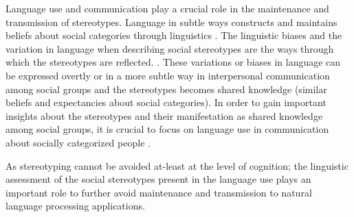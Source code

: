  Language use and communication play a crucial role in the maintenance and transmission of stereotypes. Language in subtle ways constructs and maintains beliefs about social categories through linguistics \cite{beukeboom2019stereotypes}.  The linguistic biases and the variation in language when describing social stereotypes are the ways through which the stereotypes are reflected. \cite{burgers2020language}. These variations or biases in language can be expressed overtly or in a more subtle way in interpersonal communication among social groups and the stereotypes becomes shared knowledge (similar beliefs and expectancies about social categories). In order to gain important insights about the stereotypes and their manifestation as shared knowledge among social groups, it is crucial to focus on language use in communication about socially categorized people \cite{beukeboom2019stereotypes}.
 
 
 
 
 
 
 \pagebreak

As stereotyping cannot be avoided at-least at the level of cognition; the linguistic assessment of the social stereotypes present in the language use plays an important role to further avoid maintenance and transmission to natural language processing applications. 

